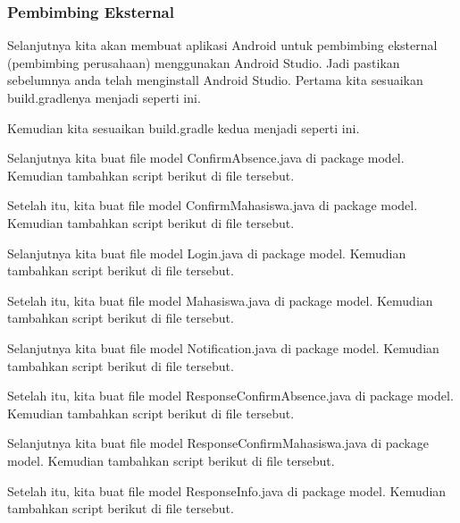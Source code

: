 \subsubsection{Pembimbing Eksternal}

Selanjutnya kita akan membuat aplikasi Android untuk pembimbing eksternal (pembimbing perusahaan) menggunakan Android Studio. Jadi pastikan sebelumnya anda telah menginstall Android Studio. Pertama kita sesuaikan build.gradlenya menjadi seperti ini.


Kemudian kita sesuaikan build.gradle kedua menjadi seperti ini.


Selanjutnya kita buat file model ConfirmAbsence.java di package model. Kemudian tambahkan script berikut di file tersebut.


Setelah itu, kita buat file model ConfirmMahasiswa.java di package model. Kemudian tambahkan script berikut di file tersebut.


Selanjutnya kita buat file model Login.java di package model. Kemudian tambahkan script berikut di file tersebut.


Setelah itu, kita buat file model Mahasiswa.java di package model. Kemudian tambahkan script berikut di file tersebut.


Selanjutnya kita buat file model Notification.java di package model. Kemudian tambahkan script berikut di file tersebut.


Setelah itu, kita buat file model ResponseConfirmAbsence.java di package model. Kemudian tambahkan script berikut di file tersebut.


Selanjutnya kita buat file model ResponseConfirmMahasiswa.java di package model. Kemudian tambahkan script berikut di file tersebut.


Setelah itu, kita buat file model ResponseInfo.java di package model. Kemudian tambahkan script berikut di file tersebut.


